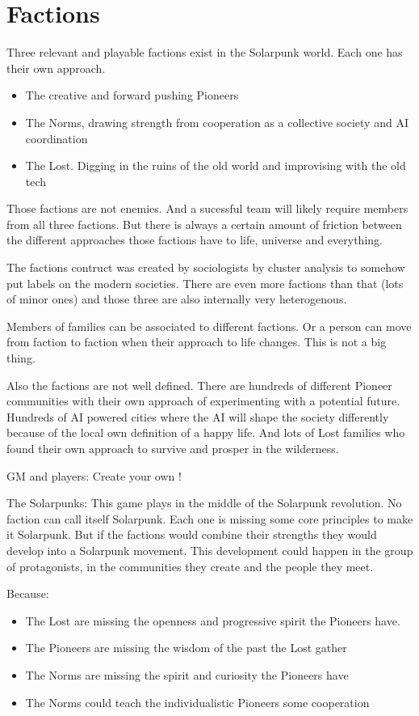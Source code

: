 \chapter{Factions}

Three relevant and playable factions exist in the Solarpunk world. Each one has their own approach. 

\begin{itemize}
    \item The creative and forward pushing Pioneers
    \item The Norms, drawing strength from cooperation as a collective society and AI coordination
    \item The Lost. Digging in the ruins of the old world and improvising with the old tech
\end{itemize}

Those factions are not enemies. And a sucessful team will likely require members from all three factions. But there is always a certain amount of friction between the different approaches those factions have to life, universe and everything.

The factions contruct was created by sociologists by cluster analysis to somehow put labels on the modern societies. There are even more factions than that (lots of minor ones) and those three are also internally very heterogenous.

Members of families can be associated to different factions. Or a person can move from faction to faction when their approach to life changes. This is not a big thing.

Also the factions are not well defined. There are hundreds of different Pioneer communities with their own approach of experimenting with a potential future. Hundreds of AI powered cities where the AI will shape the society differently because of the local own definition of a happy life. And lots of Lost families who found their own approach to survive and prosper in the wilderness.

GM and players: Create your own !

The Solarpunks: This game plays in the middle of the Solarpunk revolution. No faction can call itself Solarpunk. Each one is missing some core principles to make it Solarpunk. But if the factions would combine their strengths they would develop into a Solarpunk movement. This development could happen in the group of protagonists, in the communities they create and the people they meet.

Because:
\begin{itemize}
\item The Lost are missing the openness and progressive spirit the Pioneers have.
\item The Pioneers are missing the wisdom of the past the Lost gather
\item The Norms are missing the spirit and curiosity the Pioneers have
\item The Norms could teach the individualistic Pioneers some cooperation
\end{itemize}
